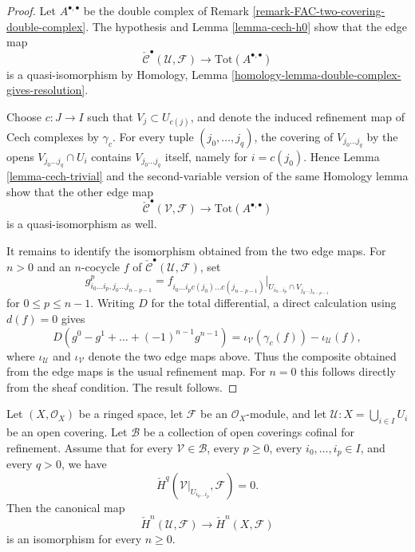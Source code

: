 \begin{proof}
Let $A^{\bullet, \bullet}$ be the double complex of
Remark \ref{remark-FAC-two-covering-double-complex}. The hypothesis and
Lemma \ref{lemma-cech-h0} show that the edge map
$$
\check{\mathcal{C}}^\bullet(\mathcal{U}, \mathcal{F})
\longrightarrow \text{Tot}(A^{\bullet, \bullet})
$$
is a quasi-isomorphism by
Homology, Lemma \ref{homology-lemma-double-complex-gives-resolution}.

Choose $c : J \to I$ such that $V_j \subset U_{c(j)}$, and denote the
induced refinement map of Cech complexes by $\gamma_c$. For every tuple
$(j_0, \ldots, j_q)$, the covering of $V_{j_0 \ldots j_q}$ by the
opens $V_{j_0 \ldots j_q} \cap U_i$ contains
$V_{j_0 \ldots j_q}$ itself, namely for $i = c(j_0)$. Hence
Lemma \ref{lemma-cech-trivial} and the second-variable version of the
same Homology lemma show that the other edge map
$$
\check{\mathcal{C}}^\bullet(\mathcal{V}, \mathcal{F})
\longrightarrow \text{Tot}(A^{\bullet, \bullet})
$$
is a quasi-isomorphism as well.

It remains to identify the isomorphism obtained from the two edge maps.
For $n > 0$ and an $n$-cocycle $f$ of
$\check{\mathcal{C}}^\bullet(\mathcal{U}, \mathcal{F})$, set
$$
g^p_{i_0 \ldots i_p,j_0 \ldots j_{n-p-1}} =
f_{i_0 \ldots i_p c(j_0) \ldots c(j_{n-p-1})}
\big|_{U_{i_0 \ldots i_p} \cap V_{j_0 \ldots j_{n-p-1}}}
$$
for $0 \leq p \leq n - 1$. Writing $D$ for the total differential, a
direct calculation using $d(f) = 0$ gives
$$
D(g^0 - g^1 + \ldots + (-1)^{n - 1}g^{n - 1})
= \iota_{\mathcal{V}}(\gamma_c(f)) - \iota_{\mathcal{U}}(f),
$$
where $\iota_{\mathcal{U}}$ and $\iota_{\mathcal{V}}$ denote the two edge
maps above. Thus the composite obtained from the edge maps is the usual refinement
map. For $n = 0$ this follows directly from the sheaf condition. The
result follows.
\end{proof}

\begin{lemma}
\label{lemma-cech-cofinal-refinements}
\begin{reference}
\cite[Chapter I, \S 4, no. 29, Theorem 1, p. 222]{FAC}
\end{reference}
Let $(X, \mathcal{O}_X)$ be a ringed space, let
$\mathcal{F}$ be an $\mathcal{O}_X$-module, and let
$\mathcal{U} : X = \bigcup_{i \in I} U_i$ be an open covering. Let
$\mathcal{B}$ be a collection of open coverings cofinal for refinement.
Assume that for every $\mathcal{V} \in \mathcal{B}$, every $p \geq 0$,
every $i_0, \ldots, i_p \in I$, and every $q > 0$, we have
$$
\check{H}^q(\mathcal{V}|_{U_{i_0 \ldots i_p}}, \mathcal{F}) = 0.
$$
Then the canonical map
$$
\check{H}^n(\mathcal{U}, \mathcal{F})
\longrightarrow \check{H}^n(X, \mathcal{F})
$$
is an isomorphism for every $n \geq 0$.
\end{lemma}

